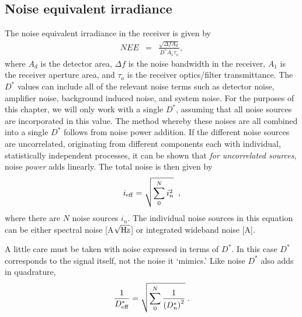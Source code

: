 \subsection{Noise equivalent irradiance}
\noindent
The noise equivalent irradiance in the receiver is given by \cite{Willers2013}
\begin{eqnarray}
NEE&=& \frac{
\sqrt{\Delta f A_d}
}{
D^\ast A_1 \tau_o
},
\label{lrfnoise}\label{laserrxn}
\end{eqnarray}
where 
$A_d$ is the detector area, 
$\Delta f$ is the noise bandwidth in the receiver, 
$A_1$ is the receiver aperture area, and 
$\tau_o$ is the receiver optics/filter transmittance. The
$D^\ast$ values can include all of the relevant noise terms such as detector noise, amplifier noise, background induced noise, and system noise. 
For the purposes of this chapter, we will only work with a single $D^\ast$, assuming that all noise sources are incorporated in this value.
The method whereby these noises are all combined into a single $D^\ast$ follows from noise power addition. If the different noise sources are uncorrelated, originating from different components each with individual, statistically independent processes, it can be shown that \textit{for uncorrelated sources},  noise \textit{power} adds linearly. The total noise is then given by
\begin{equation}
i_{\rm eff}=\sqrt{\sum_0^N i_n^2}\;\;,\label{eq:combinenoisesources}
\end{equation}
where there are $N$ noise sources $i_n$. The individual noise sources in this equation can be either spectral noise [A$\sqrt{\rm Hz}$] or integrated wideband noise [A].

A little care must be taken with noise expressed in terms of $D^\ast$. In this case $D^\ast$ corresponds to the signal itself, not the noise it `mimics.' 
Like noise $D^\ast$ also adds in quadrature,
\begin{equation}
\frac{1}{D^\ast_{\rm eff}}=\sqrt{\sum_0^N 
\frac{1}{\left(D^\ast_n\right)^2}
}\;.\label{eq:combinenoiseDeeStar}
\end{equation}

